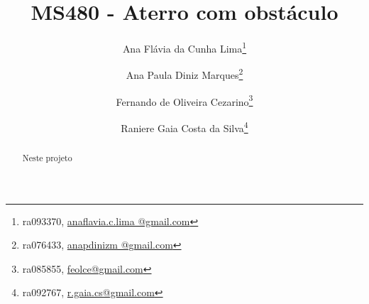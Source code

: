\documentclass[12pt,a4paper]{article}
\begin{document}
\title{MS480 - Aterro com obst\'{a}culo}
\author{Ana Flávia da Cunha Lima\footnote{ra093370, \url{anaflavia.c.lima
@gmail.com}} \and Ana Paula Diniz Marques\footnote{ra076433, \url{anapdinizm
@gmail.com}} \and Fernando de Oliveira Cezarino\footnote{ra085855, 
\url{feolce@gmail.com}} \and  Raniere Gaia Costa da Silva\footnote{ra092767, 
\url{r.gaia.cs@gmail.com}}}
\maketitle
\begin{abstract}
    Neste projeto
\end{abstract}
\tableofcontents
\newpage





\appendix







\end{document}
